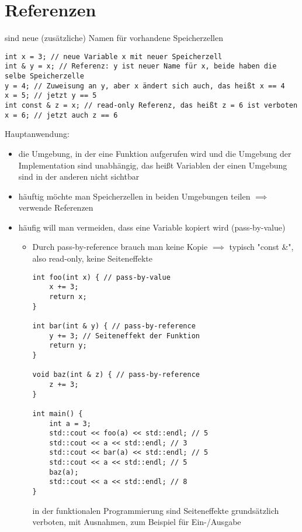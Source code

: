 \documentclass[a4paper]{scrartcl}
\begin{document}
\section{Referenzen}
\label{sec-10}
sind neue (zusätzliche) Namen für vorhandene Speicherzellen
\begin{verbatim}
int x = 3; // neue Variable x mit neuer Speicherzell
int & y = x; // Referenz: y ist neuer Name für x, beide haben die selbe Speicherzelle
y = 4; // Zuweisung an y, aber x ändert sich auch, das heißt x == 4
x = 5; // jetzt y == 5
int const & z = x; // read-only Referenz, das heißt z = 6 ist verboten
x = 6; // jetzt auch z == 6
\end{verbatim}
Hauptanwendung:
\begin{itemize}
\item die Umgebung, in der eine Funktion aufgerufen wird und die Umgebung der Implementation sind unabhängig, das heißt Variablen der einen Umgebung sind in der anderen nicht sichtbar
\item häuftig möchte man Speicherzellen in beiden Umgebungen teilen $\implies$ verwende Referenzen
\item häufig will man vermeiden, dass eine Variable kopiert wird (pass-by-value)
\begin{itemize}
\item Durch pass-by-reference brauch man keine Kopie $\implies$ typisch "const \&", also read-only, keine Seiteneffekte
\begin{verbatim}
int foo(int x) { // pass-by-value
	x += 3;
	return x;
}

int bar(int & y) { // pass-by-reference
	y += 3; // Seiteneffekt der Funktion
	return y;
}

void baz(int & z) { // pass-by-reference
	z += 3;
}

int main() {
	int a = 3;
	std::cout << foo(a) << std::endl; // 5
	std::cout << a << std::endl; // 3
	std::cout << bar(a) << std::endl; // 5
	std::cout << a << std::endl; // 5
	baz(a);
	std::cout << a << std::endl; // 8
}
\end{verbatim}
in der funktionalen Programmierung sind Seiteneffekte grundsätzlich verboten, 
mit Ausnahmen, zum Beispiel für Ein-/Ausgabe
\end{itemize}
\end{itemize}
\end{document}

